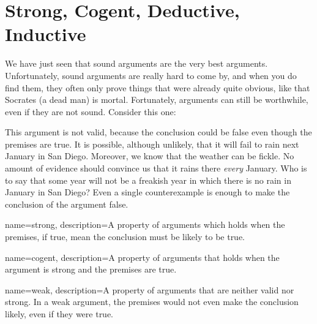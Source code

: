 \section{Strong, Cogent, Deductive, Inductive}

We have just seen that sound arguments are the very best arguments. Unfortunately, sound arguments are really hard to come by, and when you do find them, they often only prove things that were already quite obvious, like that Socrates (a dead man) is mortal. Fortunately, arguments can still be worthwhile, even if they are not sound. Consider this one:

\begin{kormanize}
\end{kormanize}


This argument is not valid, because the conclusion could be false even though the premises are true. It is possible, although unlikely, that it will fail to rain next January in San Diego. Moreover, we know that the weather can be fickle. No amount of evidence should convince us that it rains there \emph{every} January. Who is to say that some year will not be a freakish year in which there is no rain in January in San Diego? Even a single counterexample is enough to make the conclusion of the argument false.

{
name=strong,
description={A property of arguments which holds when the premises, if true, mean the conclusion must be likely to be true.}
}


{
name=cogent,
description={A property of arguments that holds when the argument is strong and the premises are true.}
}



{
name=weak,
description={A property of arguments that are neither valid nor strong. In a weak argument, the premises would not even make the conclusion likely, even if they were true.}
}



